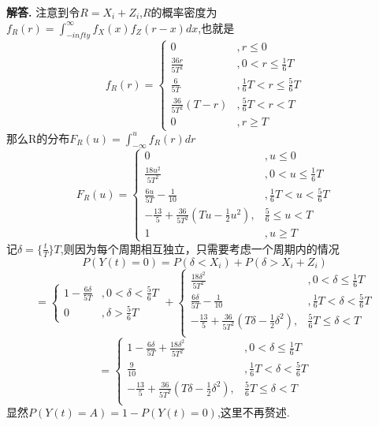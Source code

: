 \documentclass[12pt, a4paper, oneside]{ctexart}
\newenvironment{solution}{\par\noindent\textbf{解答. }}{\par}
\begin{document}
	\begin{solution}
		注意到令$R=X_i+Z_i$,$R$的概率密度为$f_R(r)=\int_{-infty}^{\infty}f_X(x)f_Z(r-x)dx$,也就是\\
		$$
		f_R(r)=\begin{cases}
			0&,r\le 0\\
			\frac{36r}{5T^2}&,0<r\le \frac{1}{6}T\\
			\frac{6}{5T}&,\frac{1}{6}T<r\le \frac{5}{6}T\\
			\frac{36}{5T^2}(T-r)&,\frac{5}{6}T<r<T\\
			0&,r\ge T
		\end{cases}
		$$		
		那么R的分布$F_R(u)=\int_{-\infty}^{u}f_R(r)dr$\\
		$$
			F_R(u)=\begin{cases}
				0&,u\le 0\\
				\frac{18u^2}{5T^2}&,0<u\le \frac{1}{6}T\\
				\frac{6u}{5T}-\frac{1}{10}&,\frac{1}{6}T<u<\frac{5}{6}T\\
				-\frac{13}{5}+\frac{36}{5T^2}(Tu-\frac{1}{2}u^2),&\frac{5}{6}\le u<T\\
				1&,u\ge T
			\end{cases}
		$$
		记$\delta = \{\frac{t}{T}\}T$,则因为每个周期相互独立，只需要考虑一个周期内的情况\\
		$$
		P({Y(t)=0})=P({\delta< X_i})+P({\delta>X_i+Z_i})
		$$
		$$
		=\begin{cases}
			1-\frac{6\delta}{5T}&,0<\delta <\frac{5}{6}T\\
			0&,\delta>\frac{5}{6}T
		\end{cases}+
		\begin{cases}
			\frac{18\delta ^2}{5T^2}&,0<\delta \le \frac{1}{6}T\\
			\frac{6\delta }{5T}-\frac{1}{10}&,\frac{1}{6}T<\delta <\frac{5}{6}T\\
			-\frac{13}{5}+\frac{36}{5T^2}(T\delta -\frac{1}{2}\delta ^2),&\frac{5}{6}T\le \delta <T\\
		\end{cases}$$
		$$
		=\begin{cases}
			1-\frac{6\delta}{5T}+\frac{18\delta ^2}{5T^2}&,0<\delta \le \frac{1}{6}T\\
			\frac{9}{10}&,\frac{1}{6}T<\delta <\frac{5}{6}T\\
			-\frac{13}{5}+\frac{36}{5T^2}(T\delta -\frac{1}{2}\delta ^2),&\frac{5}{6}T\le \delta <T\\
		\end{cases}
		$$
		显然$P({Y(t)=A})=1-P({Y(t)=0})$,这里不再赘述.
	\end{solution}
	
\end{document}
